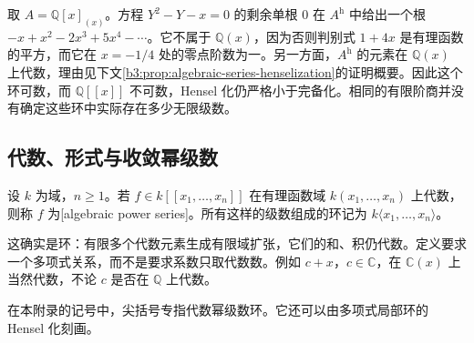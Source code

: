 \begin{example}\label{b3:exm:hensel-finite-jets}
	取 \(A=\mathbb Q[x]_{(x)}\)。方程 \(Y^2-Y-x=0\) 的剩余单根 \(0\) 在 \(A^{\mathrm h}\) 中给出一个根 \(-x+x^2-2x^3+5x^4-\cdots\)。它不属于 \(\mathbb Q(x)\)，因为否则判别式 \(1+4x\) 是有理函数的平方，而它在 \(x=-1/4\) 处的零点阶数为一。另一方面，\(A^{\mathrm h}\) 的元素在 \(\mathbb Q(x)\) 上代数，理由见下文\cref{b3:prop:algebraic-series-henselization}的证明概要。因此这个环可数，而 \(\mathbb Q[\![x]\!]\) 不可数，Hensel 化仍严格小于完备化。相同的有限阶商并没有确定这些环中实际存在多少无限级数。
\end{example}

\subsection{代数、形式与收敛幂级数}
\label{b3:subsec:D01:03}

\begin{definition}\label{b3:def:algebraic-power-series}
	设 \(k\) 为域，\(n\ge1\)。若 \(f\in k[\![x_1,\ldots,x_n]\!]\) 在有理函数域 \(k(x_1,\ldots,x_n)\) 上代数，则称 \(f\) 为[algebraic power series]。所有这样的级数组成的环记为 \(k\langle x_1,\ldots,x_n\rangle\)。
\end{definition}

这确实是环：有限多个代数元素生成有限域扩张，它们的和、积仍代数。定义要求一个多项式关系，而不是要求系数只取代数数。例如 \(c+x\)，\(c\in\mathbb C\)，在 \(\mathbb C(x)\) 上当然代数，不论 \(c\) 是否在 \(\mathbb Q\) 上代数。

\ProseParagraphBreak
在本附录的记号中，尖括号专指代数幂级数环。它还可以由多项式局部环的 Hensel 化刻画。

